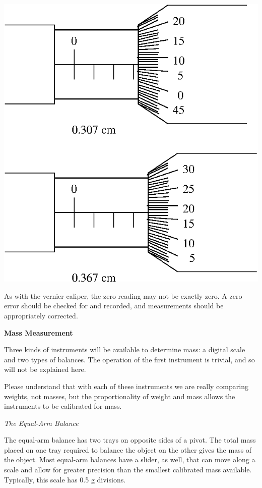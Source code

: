 \vspace{0.3cm}
{\par\centering \includegraphics{instrumentation_fig1.eps} \par}
\vspace{0.3cm}

As with the vernier caliper, the zero reading may not be exactly zero. A zero error should be checked for and recorded, and measurements should be appropriately corrected.

\textbf{Mass Measurement}

Three kinds of instruments will be available to determine mass: a digital scale and two types of balances. The operation of the first instrument is trivial, and so will not be explained here.

Please understand that with each of these instruments we are really comparing weights, not masses, but the proportionality of weight and mass allows the instruments to be calibrated for mass.

\textit{The Equal-Arm Balance}

The equal-arm balance has two trays on opposite sides of a pivot. The total mass placed on one tray required to balance the object on the other gives the mass of the object. Most equal-arm balances have a slider, as well, that can move along a scale and allow for greater precision than the smallest calibrated mass available. Typically, this scale has 0.5 g divisions.


